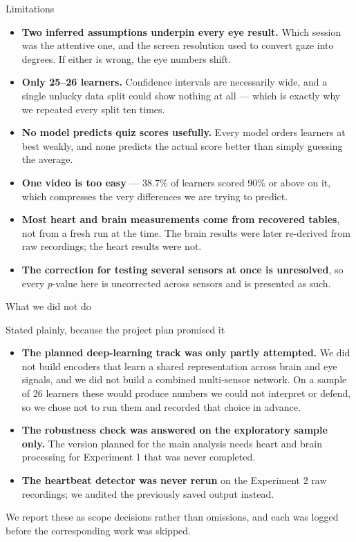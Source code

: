 \documentclass[aspectratio=169,10pt]{beamer}
\makeatletter
\newcommand{\sidenote}[1]{{\scriptsize\color{mubeamer@gray7}\sloppy\par#1\par}}
\makeatother
\begin{document}
\begin{frame}{Limitations}
  \small
  \begin{itemize}
    \item \textbf{Two inferred assumptions underpin every eye result.} Which
      session was the attentive one, and the screen resolution used to convert
      gaze into degrees. If either is wrong, the eye numbers shift.
    \item \textbf{Only 25--26 learners.} Confidence intervals are necessarily
      wide, and a single unlucky data split could show nothing at all --- which
      is exactly why we repeated every split ten times.
    \item \textbf{No model predicts quiz scores usefully.} Every model orders
      learners at best weakly, and none predicts the actual score better than
      simply guessing the average.
    \item \textbf{One video is too easy} --- 38.7\% of learners scored 90\% or
      above on it, which compresses the very differences we are trying to
      predict.
    \item \textbf{Most heart and brain measurements come from recovered
      tables}, not from a fresh run at the time. The brain results were later
      re-derived from raw recordings; the heart results were not.
    \item \textbf{The correction for testing several sensors at once is
      unresolved}, so every $p$-value here is uncorrected across sensors and
      is presented as such.
  \end{itemize}
\end{frame}

\begin{frame}{What we did not do}
  \begin{block}{Stated plainly, because the project plan promised it}
    \begin{itemize}\small
      \item \textbf{The planned deep-learning track was only partly
        attempted.} We did not build encoders that learn a shared
        representation across brain and eye signals, and we did not build a
        combined multi-sensor network. On a sample of 26 learners these would
        produce numbers we could not interpret or defend, so we chose not to
        run them and recorded that choice in advance.
      \item \textbf{The robustness check was answered on the exploratory
        sample only.} The version planned for the main analysis needs heart
        and brain processing for Experiment 1 that was never completed.
      \item \textbf{The heartbeat detector was never rerun} on the Experiment
        2 raw recordings; we audited the previously saved output instead.
    \end{itemize}
  \end{block}

  \vspace{0.4em}
  \sidenote{We report these as scope decisions rather than omissions, and each
  was logged before the corresponding work was skipped.}
\end{frame}
\end{document}
